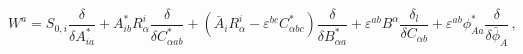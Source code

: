 \begin{equation*}
W^{a}=S_{0,i}\frac{\delta }{\delta A_{ia}^{\ast }}+A_{ib}^{\ast }R_{\alpha
}^{i}\frac{\delta }{\delta C_{\alpha ab}^{\ast }}+(\bar{A}_{i}R_{\alpha
}^{i}-\varepsilon ^{bc}C_{\alpha bc}^{\ast })\frac{\delta }{\delta B_{\alpha
a}^{\ast }}+\varepsilon ^{ab}B^{\alpha }\frac{\delta _{l}}{\delta C_{\alpha
b}}+\varepsilon ^{ab}\phi _{Aa}^{\ast }\frac{\delta }{\delta \bar{\phi}_{A}}%
\,,
\end{equation*}

